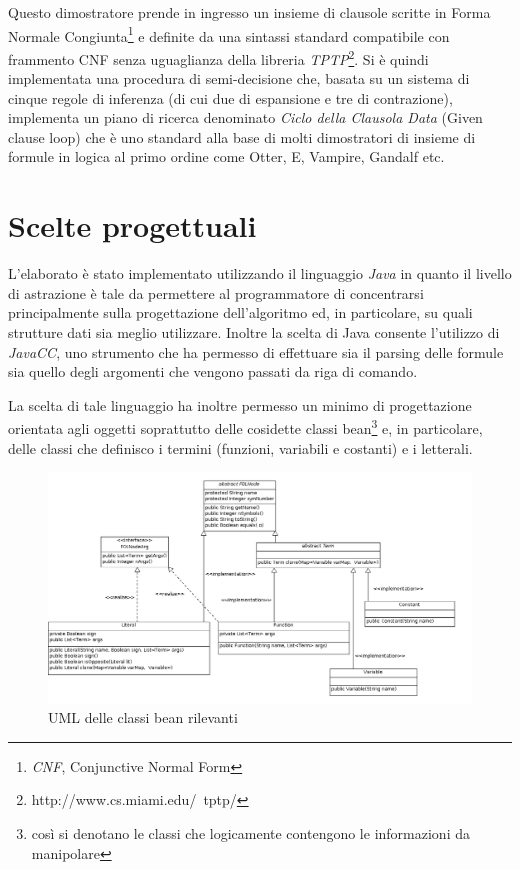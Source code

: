 \documentclass[a4paper,11pt]{article}
\begin{document}
Questo dimostratore prende in ingresso un insieme di clausole scritte in Forma Normale Congiunta\footnote{\emph{CNF}, Conjunctive Normal Form} e definite da una sintassi standard compatibile con frammento CNF senza uguaglianza della libreria \emph{TPTP}\footnote{http://www.cs.miami.edu/~tptp/}. Si è quindi implementata una procedura di semi-decisione che, basata su un sistema di cinque regole di inferenza (di cui due di espansione e tre di contrazione), implementa un piano di ricerca denominato \emph{Ciclo della Clausola Data} (Given clause loop) che è uno standard alla base di molti dimostratori di insieme di formule in logica al primo ordine come Otter, E, Vampire, Gandalf etc.

\section{Scelte progettuali}
L'elaborato è stato implementato utilizzando il linguaggio \emph{Java} in quanto il livello di astrazione è tale da permettere al programmatore di concentrarsi principalmente sulla progettazione dell'algoritmo ed, in particolare, su quali strutture dati sia meglio utilizzare. 
Inoltre la scelta di Java consente l'utilizzo di \emph{JavaCC}, uno strumento che ha permesso di effettuare sia il parsing delle formule sia quello degli argomenti che vengono passati da riga di comando.\par
La scelta di tale linguaggio ha inoltre permesso un minimo di progettazione orientata agli oggetti soprattutto delle cosidette classi bean\footnote{così si denotano le classi che logicamente contengono le informazioni da manipolare} e, in particolare, delle classi che definisco i termini (funzioni, variabili e costanti) e i letterali.

\begin{figure}[h]
\includegraphics[width=1\columnwidth]{beanClassUML.png}
\caption{UML delle classi bean rilevanti}
\label{beanClassUML}
\end{figure}
\end{document}
